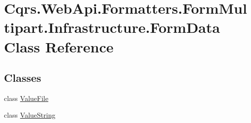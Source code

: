 \hypertarget{classCqrs_1_1WebApi_1_1Formatters_1_1FormMultipart_1_1Infrastructure_1_1FormData}{}\section{Cqrs.\+Web\+Api.\+Formatters.\+Form\+Multipart.\+Infrastructure.\+Form\+Data Class Reference}
\label{classCqrs_1_1WebApi_1_1Formatters_1_1FormMultipart_1_1Infrastructure_1_1FormData}
\subsection*{Classes}
\begin{DoxyCompactItemize}
\item 
class \hyperlink{classCqrs_1_1WebApi_1_1Formatters_1_1FormMultipart_1_1Infrastructure_1_1FormData_1_1ValueFile}{Value\+File}
\item 
class \hyperlink{classCqrs_1_1WebApi_1_1Formatters_1_1FormMultipart_1_1Infrastructure_1_1FormData_1_1ValueString}{Value\+String}
\end{DoxyCompactItemize}
